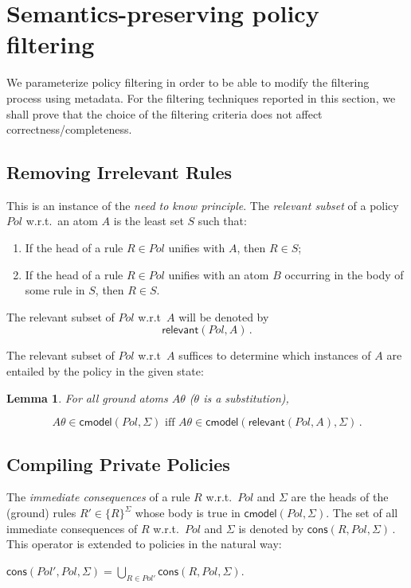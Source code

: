 \documentclass{article}
\newtheorem{lemma}{Lemma}
\newcommand{\m}[1]{\ensuremath{\mathsf{#1}}}
\newcommand{\x}[1]{\ensuremath{\mathit{#1}}}
\begin{document}
        \section{Semantics-preserving policy filtering}
        \label{sec-no-loss}


We parameterize policy filtering in order to be able to modify the
filtering process using metadata.   For the filtering techniques
reported in this section, we shall prove that the choice of
the filtering criteria does not affect correctness/completeness.


        \subsection{Removing Irrelevant Rules}

This is an instance of the \emph{need to know principle}.
%
The \emph{relevant subset} of a policy \x{Pol} w.r.t.\ an atom $A$ is
the least set $S$ such that:
\begin{enumerate}
\item If the head of a rule $R\in\x{Pol}$ unifies with $A$, then $R\in S$;
\item If the head of a rule $R\in\x{Pol}$ unifies with an atom $B$
        occurring in the body of some rule in $S$, then $R\in S$. 
\end{enumerate}
The relevant subset of \x{Pol} w.r.t\ $A$ will be denoted by
\[
        \m{relevant(\x{Pol,A})} \,.
\]

The relevant subset of \x{Pol} w.r.t\ $A$ suffices to determine which
instances of $A$ are entailed by the policy in the given state:

\begin{lemma}                           \label{lem-relevant}
For all ground atoms $A\theta$ ($\theta$ is a substitution),
\end{lemma}
\[
   A\theta \in \m{cmodel}(\x{Pol},\Sigma) \mbox{ iff }
        A\theta \in \m{cmodel}(\m{relevant}(\x{Pol},A),\Sigma) \,.
\]

        \subsection{Compiling Private Policies}


The \emph{immediate consequences} of a rule $R$ w.r.t.\ \x{Pol} and
$\Sigma$ are the heads of the (ground) rules $R' \in \{R\}^\Sigma$
whose body is true in $\m{cmodel}(\x{Pol},\Sigma)$.  The set of all
immediate consequences of $R$ w.r.t.\ \x{Pol} and $\Sigma$ is denoted
by
$
        \m{cons}(R,\x{Pol},\Sigma) \,.
$
This operator is extended to policies in the natural way:
\begin{center}
$\m{cons}(\x{Pol'}, \x{Pol},\Sigma) = \bigcup_{R\in\x{Pol'}}
\m{cons}(R,\x{Pol},\Sigma)$.
\end{center}
\end{document}
